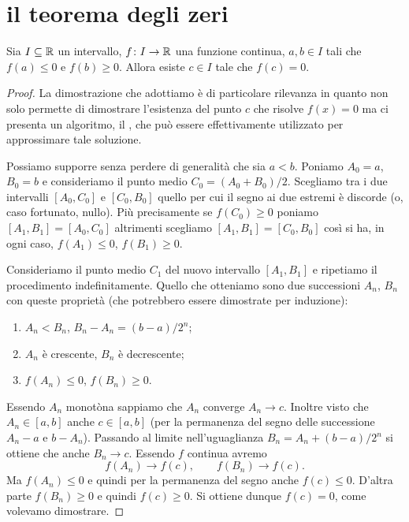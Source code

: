 \section{il teorema degli zeri}

\begin{theorem}
\mymark{***}%
%
%
\label{th:zeri}%
Sia $I\subseteq \mathbb R$ un intervallo, $f\colon I \to \mathbb R$ una funzione
continua, $a,b\in I$ tali che $f(a)\le 0$ e $f(b)\ge 0$.
Allora esiste $c\in I$ tale che $f(c)=0$.
\end{theorem}

\begin{proof}
\mymark{***}
La dimostrazione che adottiamo è di particolare rilevanza in quanto
non solo permette di dimostrare l'esistenza del punto $c$ che risolve
$f(x)=0$
ma ci presenta
un algoritmo, il ,
che può essere effettivamente utilizzato per approssimare
tale soluzione.

Possiamo supporre senza perdere di  generalità che sia $a<b$.
Poniamo $A_0 = a$, $B_0= b$ e consideriamo il punto medio $C_0 = (A_0+B_0)/2$.
Scegliamo tra i due intervalli $[A_0, C_0]$ e $[C_0,B_0]$ quello per cui
il segno ai due estremi è discorde (o, caso fortunato, nullo).
Più precisamente se $f(C_0)\ge 0$ poniamo $[A_1,B_1] = [A_0,C_0]$ altrimenti
scegliamo $[A_1,B_1] = [C_0,B_0]$ così si ha, in ogni caso,
$f(A_1)\le 0$, $f(B_1)\ge 0$.

Consideriamo il punto medio $C_1$ del nuovo intervallo $[A_1,B_1]$ e ripetiamo
il procedimento indefinitamente. Quello che otteniamo sono due successioni
$A_n$, $B_n$ con queste proprietà (che potrebbero essere dimostrate per induzione):
\begin{enumerate}
\item $A_n < B_n$, $B_n - A_n = (b-a)/2^n$;
\item $A_n$ è crescente, $B_n$ è decrescente;
\item $f(A_n)\le 0$, $f(B_n)\ge 0$.
\end{enumerate}

Essendo $A_n$ monotòna sappiamo che $A_n$ converge $A_n\to c$.
Inoltre visto che $A_n \in [a,b]$ anche $c\in [a,b]$ (per la permanenza del
segno delle successione $A_n-a$ e $b-A_n$).
Passando al limite nell'uguaglianza $B_n = A_n + (b-a)/2^n$
si ottiene che anche $B_n \to c$. Essendo $f$ continua
avremo
\[
f(A_n) \to f(c), \qquad
f(B_n) \to f(c).
\]
Ma $f(A_n)\le 0$ e quindi per la permanenza del segno anche $f(c)\le 0$.
D'altra parte $f(B_n) \ge 0$ e quindi $f(c)\ge 0$.
Si ottiene dunque $f(c) = 0$, come volevamo dimostrare.
\end{proof}

